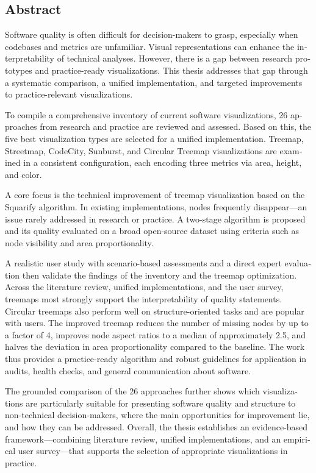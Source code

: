 
\begin{otherlanguage}{american}
	\chapter*{Abstract}
Software quality is often difficult for decision-makers to grasp, especially when codebases and metrics are unfamiliar. Visual representations can enhance the interpretability of technical analyses. However, there is a gap between research prototypes and practice-ready visualizations. This thesis addresses that gap through a systematic comparison, a unified implementation, and targeted improvements to practice-relevant visualizations.

To compile a comprehensive inventory of current software visualizations, 26 approaches from research and practice are reviewed and assessed. Based on this, the five best visualization types are selected for a unified implementation. Treemap, Streetmap, CodeCity, Sunburst, and Circular Treemap visualizations are examined in a consistent configuration, each encoding three metrics via area, height, and color.

A core focus is the technical improvement of treemap visualization based on the Squarify algorithm. In existing implementations, nodes frequently disappear—an issue rarely addressed in research or practice. A two-stage algorithm is proposed and its quality evaluated on a broad open-source dataset using criteria such as node visibility and area proportionality.

A realistic user study with scenario-based assessments and a direct expert evaluation then validate the findings of the inventory and the treemap optimization. Across the literature review, unified implementations, and the user survey, treemaps most strongly support the interpretability of quality statements. Circular treemaps also perform well on structure-oriented tasks and are popular with users. The improved treemap reduces the number of missing nodes by up to a factor of 4, improves node aspect ratios to a median of approximately 2{.}5, and halves the deviation in area proportionality compared to the baseline. The work thus provides a practice-ready algorithm and robust guidelines for application in audits, health checks, and general communication about software.

The grounded comparison of the 26 approaches further shows which visualizations are particularly suitable for presenting software quality and structure to non-technical decision-makers, where the main opportunities for improvement lie, and how they can be addressed. Overall, the thesis establishes an evidence-based framework—combining literature review, unified implementations, and an empirical user survey—that supports the selection of appropriate visualizations in practice.
\end{otherlanguage}